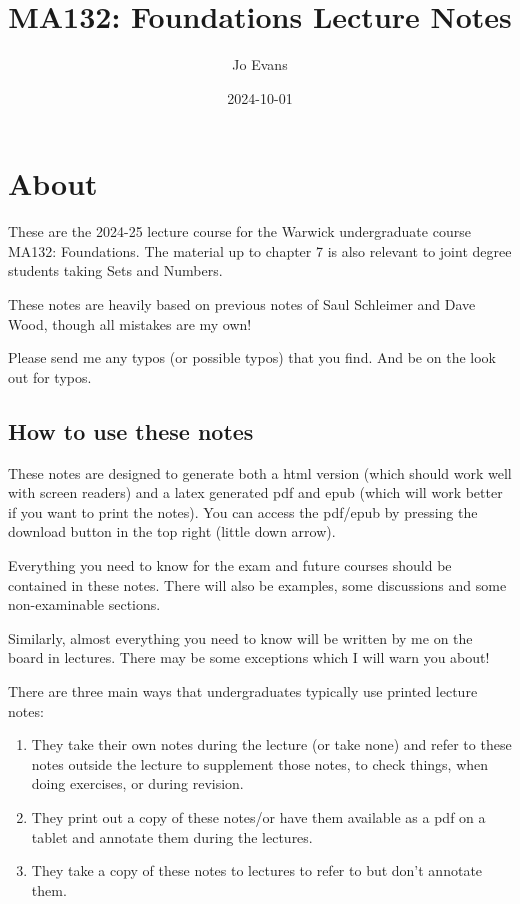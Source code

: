 \documentclass[
]{book}
\title{MA132: Foundations Lecture Notes}
\author{Jo Evans}
\date{2024-10-01}
\theoremstyle{definition}
\theoremstyle{definition}
\theoremstyle{definition}
\theoremstyle{definition}
\theoremstyle{remark}
\begin{document}
\maketitle

{
\setcounter{tocdepth}{1}
\tableofcontents
}
\chapter{About}\label{about}

These are the 2024-25 lecture course for the Warwick undergraduate course MA132: Foundations. The material up to chapter 7 is also relevant to joint degree students taking Sets and Numbers.

These notes are heavily based on previous notes of Saul Schleimer and Dave Wood, though all mistakes are my own!

Please send me any typos (or possible typos) that you find. And be on the look out for typos.

\section{How to use these notes}\label{how-to-use-these-notes}

These notes are designed to generate both a html version (which should work well with screen readers) and a latex generated pdf and epub (which will work better if you want to print the notes). You can access the pdf/epub by pressing the download button in the top right (little down arrow).

Everything you need to know for the exam and future courses should be contained in these notes. There will also be examples, some discussions and some non-examinable sections.

Similarly, almost everything you need to know will be written by me on the board in lectures. There may be some exceptions which I will warn you about!

There are three main ways that undergraduates typically use printed lecture notes:

\begin{enumerate}
\def\labelenumi{\arabic{enumi}.}
\item
  They take their own notes during the lecture (or take none) and refer to these notes outside the lecture to supplement those notes, to check things, when doing exercises, or during revision.
\item
  They print out a copy of these notes/or have them available as a pdf on a tablet and annotate them during the lectures.
\item
  They take a copy of these notes to lectures to refer to but don't annotate them.
\end{enumerate}
\end{document}
